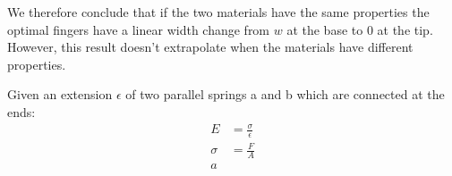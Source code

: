 We therefore conclude that if the two materials have the same properties
the optimal fingers have a linear width change from $w$ at the base to $0$ at the tip.
However, this result doesn't extrapolate when the materials have different properties.

Given an extension $\epsilon$ of two parallel springs a and b which are connected at the ends:
\begin{align*}
    E &= \frac{\sigma}{\epsilon} \\
    \sigma &= \frac{F}{A} \\
    a
\end{align*}

